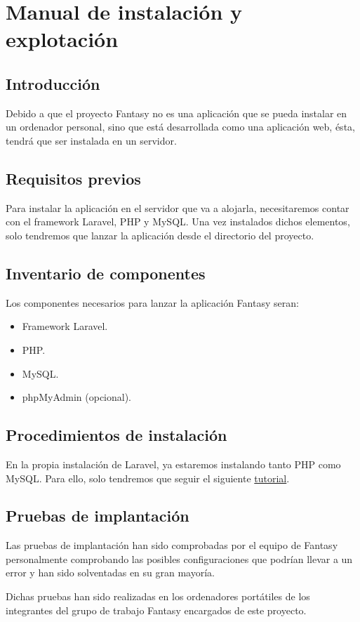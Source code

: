 \chapter{Manual de instalación y explotación}
\section{Introducción}
Debido a que el proyecto Fantasy no es una aplicación que se pueda instalar en un ordenador personal, sino que está desarrollada como una aplicación web, ésta, tendrá que ser instalada en un servidor.

\section{Requisitos previos}
Para instalar la aplicación en el servidor que va a alojarla, necesitaremos contar con el framework Laravel, PHP y MySQL. Una vez instalados dichos elementos, solo tendremos que lanzar la aplicación desde el directorio del proyecto.

\section{Inventario de componentes}
Los componentes necesarios para lanzar la aplicación Fantasy seran:
\begin{itemize}
	\item Framework Laravel.
	\item PHP.
	\item MySQL.
	\item phpMyAdmin (opcional).
\end{itemize}

\section{Procedimientos de instalación}
En la propia instalación de Laravel, ya estaremos instalando tanto PHP como MySQL. Para ello, solo tendremos que seguir el siguiente \href{https://styde.net/instalacion-de-composer-y-laravel/}{tutorial}.



\section{Pruebas de implantación}
Las pruebas de implantación han sido comprobadas por el equipo de Fantasy personalmente comprobando las posibles configuraciones que podrían llevar a un error y han sido solventadas en su gran mayoría.

Dichas pruebas han sido realizadas en los ordenadores portátiles de los integrantes del grupo de trabajo Fantasy encargados de este proyecto.
